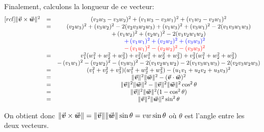 \noindent Finalement, calculons la longueur de ce vecteur:
 \[ 
 \begin{matrix}[rcl]
\lVert\vec{\boldsymbol{v}}\times\vec{\boldsymbol{w}}\rVert^2 &=& (v_2 w_3 - v_3 w_2)^2 + (v_1 w_3 - v_3 w_1)^2 + (v_1 w_2 - v_2 w_1)^2 \\
&=& (v_2 w_3)^2 + (v_3 w_2)^2 - 2(v_2 v_3 w_2 w_3) + (v_1 w_3)^2 + (v_3 w_1)^2 - 2 (v_1 v_3 w_1 w_3) \\
 && +\, (v_1 w_2)^2 + (v_2 w_1)^2  -2(v_1 v_2 w_1 w_2) \\
 &&  \qquad {\color{blue} +\, (v_1 w_1)^2 + (v_2w_2)^2 + (v_3 w_3)^2} \\
  &&  \qquad {\color{red} -\, (v_1 w_1)^2 - (v_2w_2)^2 - (v_3 w_3)^2} \\
  &=& v_1^2(w_1^2 + w_2^2 + w_3^2) + v_2^2(w_1^2+w_2^2+w_3^2)  + v_3^2(w_1^2+w_2^2+w_3^2) \\
  &&  -\, (v_1 w_1)^2 - (v_2w_2)^2 - (v_3 w_3)^2 -2(v_1 v_2 w_1 w_2) - 2 (v_1 v_3 w_1 w_3) - 2(v_2 v_3 w_2 w_3) \\
  &=& (v_1^2 + v_2^2 + v_3^2)(w_1^2 + w_2^2 + w_3^2) - (u_1v_1 + u_2v_2 + u_3 v_3)^2 \\
  &=& \lVert\vec{\boldsymbol{v}}\rVert^2 \lVert\vec{\boldsymbol{w}}\rVert^2 - (\vec{\boldsymbol{v}}\cdot\vec{\boldsymbol{w}})^2 \\
  &=&  \lVert\vec{\boldsymbol{v}}\rVert^2 \lVert\vec{\boldsymbol{w}}\rVert^2 -  \lVert\vec{\boldsymbol{v}}\rVert^2 \lVert\vec{\boldsymbol{w}}\rVert^2\cos^2\theta \\
  &=&  \lVert\vec{\boldsymbol{v}}\rVert^2 \lVert\vec{\boldsymbol{w}}\rVert^2 (1-\cos^2\theta) \\
  &=&  \lVert\vec{\boldsymbol{v}}\rVert^2 \lVert\vec{\boldsymbol{w}}\rVert^2 \sin^2\theta
 \end{matrix}
 \]
 
\noindent On obtient donc 
$\lVert\vec{\boldsymbol{v}}\times\vec{\boldsymbol{w}}\rVert =  \lVert\vec{\boldsymbol{v}}\rVert \lVert\vec{\boldsymbol{w}}\rVert \sin\theta = vw\sin\theta$ 
où $\theta$ est l'angle entre les deux vecteurs.


